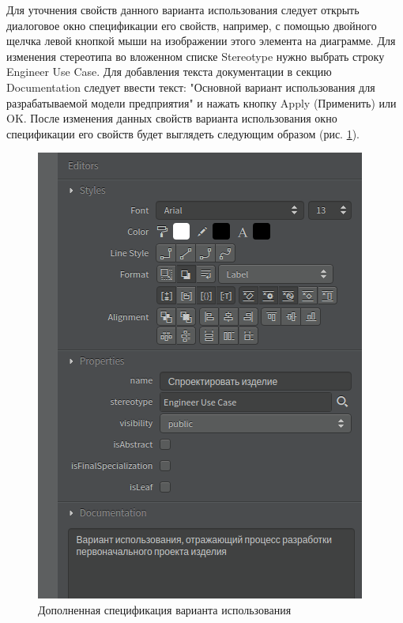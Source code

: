 \documentclass[a4paper,12pt]{report}
\begin{document}
Для уточнения свойств данного варианта использования следует открыть диалоговое окно спецификации его свойств, например, с помощью двойного щелчка левой кнопкой мыши на изображении этого элемента на диаграмме. Для изменения стереотипа во вложенном списке Stereotype нужно выбрать строку Engineer Use Case. Для добавления текста документации в секцию Documentation следует ввести текст: "Основной вариант использования для разрабатываемой модели предприятия" и нажать кнопку Apply (Применить) или OK. После изменения данных свойств варианта использования окно спецификации его свойств будет выглядеть следующим образом (рис. \ref{fig:actioneditors}).


\begin{figure}[h!]
	\centering
	\includegraphics[width=0.4\linewidth]{images/actioneditors}
	\caption{Дополненная спецификация варианта использования}
	\label{fig:actioneditors}
\end{figure}
\end{document}
